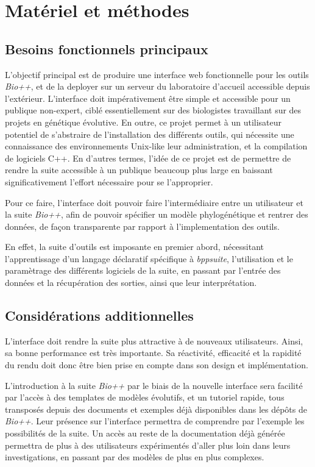 \section{Matériel et méthodes}

\subsection{Besoins fonctionnels principaux}

L'objectif principal est de produire une interface web fonctionnelle pour les outils \textit{Bio++},
et de la deployer sur un serveur du laboratoire d'accueil accessible depuis l'extérieur.
L'interface doit impérativement être simple et accessible pour un publique non-expert,
ciblé essentiellement sur des biologistes travaillant sur des projets en génétique évolutive.
En outre, ce projet permet à un utilisateur potentiel
de s'abstraire de l'installation des différents outils,
qui nécessite une connaissance des environnements Unix-like
leur administration, et la compilation de logiciels C++.
En d'autres termes, l'idée de ce projet
est de permettre de rendre la suite accessible
à un publique beaucoup plus large
en baissant significativement l'effort nécessaire
pour se l'approprier.

Pour ce faire, l'interface doit pouvoir faire l'intermédiaire entre un utilisateur
et la suite \textit{Bio++},
afin de pouvoir spécifier un modèle phylogénétique et rentrer des données,
de façon transparente par rapport à l'implementation des outils.

En effet, la suite d'outils est imposante en premier abord,
nécessitant l'apprentissage d'un langage déclaratif spécifique à \textit{bppsuite},
l'utilisation et le paramètrage des différents logiciels de la suite,
en passant par l'entrée des données et la récupération des sorties,
ainsi que leur interprétation.


\subsection{Considérations additionnelles}

L'interface doit rendre la suite plus attractive à de nouveaux utilisateurs.
Ainsi, sa bonne performance est très importante.
Sa réactivité, efficacité et la rapidité du rendu
doit donc être bien prise en compte dans son design et implémentation.

L'introduction à la suite \textit{Bio++} par le biais de la nouvelle interface
sera facilité par l'accès à des templates de modèles évolutifs,
et un tutoriel rapide,
tous transposés depuis des documents et exemples
déjà disponibles dans les dépôts de \textit{Bio++}.
Leur présence sur l'interface permettra de comprendre par l'exemple
les possibilités de la suite.
Un accès au reste de la documentation déjà générée permettra de plus
à des utilisateurs expérimentés d'aller plus loin dans leurs investigations,
en passant par des modèles de plus en plus complexes.


